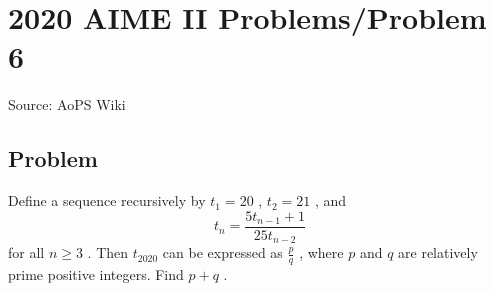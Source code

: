 \documentclass[12pt]{article}
\begin{document}
\section*{{2020 AIME II Problems/Problem 6}}
Source: AoPS Wiki

\subsection*{Problem}
Define a sequence recursively by $t_1 = 20$ , $t_2 = 21$ , and \[t_n = \frac{5t_{n-1}+1}{25t_{n-2}}\] for all $n \ge 3$ . Then $t_{2020}$ can be expressed as $\frac{p}{q}$ , where $p$ and $q$ are relatively prime positive integers. Find $p+q$ .
\end{document}
